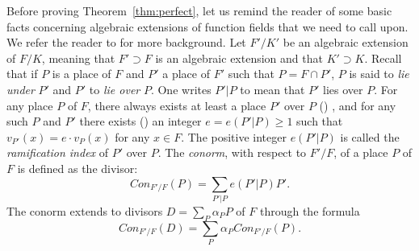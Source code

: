 \documentclass{article}
\theoremstyle{plain}
\theoremstyle{definition}
\theoremstyle{remark}
\renewcommand{\geq}{\geqslant}
\begin{document}
{
Before proving Theorem~\ref{thm:perfect}, let us remind the reader of
some basic facts concerning algebraic extensions of function fields
that we need to call upon. We refer the reader to
\cite[Chapter III]{Stichtenoth} for more background.
Let $F'/K'$ be an algebraic
extension of $F/K$, meaning that $F'\supset F$ is an algebraic
extension and that $K'\supset K$.
Recall that if $P$ is a place of $F$ and $P'$ a place of $F'$ such
   that $P=F\cap P'$, $P$ is said to {\em lie under} $P'$ and $P'$ to {\em lie
   over} $P$. One writes $P'|P$ to mean that $P'$ lies over $P$.
   For any place $P$ of $F$,  there always exists at least a place
   $P'$ over $P$ (\cite[Proposition III.1.7]{Stichtenoth}) ,
   and for any such $P$ and $P'$ there exists 
   (\cite[Proposition III.1.4]{Stichtenoth}) an
   integer $e=e(P'|P)\geq 1$ such that $v_{P'}(x)=e\cdot v_P(x)$ for any
   $x\in F$.  The positive integer $e(P'|P)$ is called the
   {\em ramification index} of $P'$ over $P$. The {\em conorm}, with respect
   to $F'/F$, of a place
   $P$ of $F$ is defined as the divisor:
   $$Con_{F'/F}(P) = \sum_{P'|P}e(P'|P)P'.$$
   The conorm extends to divisors $D=\sum_P\alpha_PP$  of $F$ through
   the formula
   $$Con_{F'/F}(D) = \sum_P\alpha_P Con_{F'/F}(P).$$
}
\end{document}
